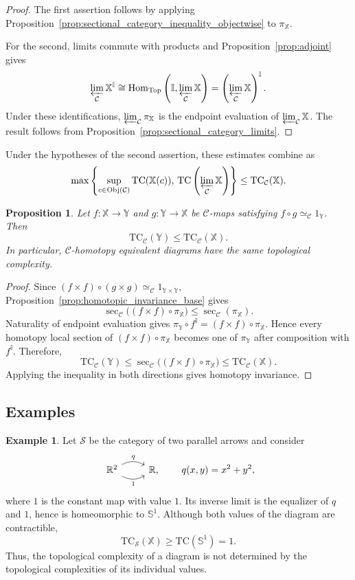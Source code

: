 \documentclass[12pt]{amsart}
\newtheorem{prop}[teo]{Proposition}
\theoremstyle{definition}
\newtheorem{ex}[teo]{Example}
\theoremstyle{remark}
\numberwithin{figure}{section}%
\newcommand{\CC}{\mathcal{C}}
\newcommand{\TC}{\mathrm{TC}}
\newcommand{\Top}{\mathrm{Top}}
\newcommand{\X}{\mathbb{X}}
\newcommand{\Y}{\mathbb{Y}}
\newcommand{\Hom}{\mathrm{Hom}}
\newcommand{\Obj}{\mathrm{Obj}}
\begin{document}
\begin{proof}
The first assertion follows by applying
Proposition~\ref{prop:sectional_category_inequality_objectwise} to
$\pi_{\X}$.

For the second, limits commute with products and
Proposition~\ref{prop:adjoint} gives
\[
\varprojlim_{\CC}\X^{\mathbb I}
\cong
\Hom_{\Top}
\left(
\mathbb I,\varprojlim_{\CC}\X
\right)
=
\left(\varprojlim_{\CC}\X\right)^{\mathbb I}.
\]
Under these identifications, $\varprojlim_{\CC}\pi_{\X}$ is the endpoint
evaluation of $\varprojlim_{\CC}\X$. The result follows from
Proposition~\ref{prop:sectional_category_limits}.
\end{proof}

Under the hypotheses of the second assertion, these estimates combine as
\[
\max\left\{
\sup_{c\in\Obj(\CC)}\TC(\X(c)),
\,
\TC\left(\varprojlim_{\CC}\X\right)
\right\}
\leq
\TC_{\CC}(\X).
\]

\begin{prop}\label{prop:TC-domination}
Let $f\colon\X\to\Y$ and $g\colon\Y\to\X$ be $\CC$-maps satisfying
$f\circ g\simeq_{\CC}1_{\Y}$. Then
\[
\TC_{\CC}(\Y)\leq\TC_{\CC}(\X).
\]
In particular, $\CC$-homotopy equivalent diagrams have the same
topological complexity.
\end{prop}

\begin{proof}
Since $(f\times f)\circ(g\times g)\simeq_{\CC}1_{\Y\times\Y}$,
Proposition~\ref{prop:homotopic_invariance_base} gives
\[
\sec_{\CC}\bigl((f\times f)\circ\pi_{\X}\bigr)
\leq
\sec_{\CC}(\pi_{\X}).
\]
Naturality of endpoint evaluation gives
$\pi_{\Y}\circ f^{\mathbb I}=(f\times f)\circ\pi_{\X}$. Hence every
homotopy local section of $(f\times f)\circ\pi_{\X}$ becomes one of
$\pi_{\Y}$ after composition with $f^{\mathbb I}$. Therefore,
\[
\TC_{\CC}(\Y)
\leq
\sec_{\CC}\bigl((f\times f)\circ\pi_{\X}\bigr)
\leq
\TC_{\CC}(\X).
\]
Applying the inequality in both directions gives homotopy invariance.
\end{proof}

\subsection{Examples}

\begin{ex}\label{ex:contractible-values-nontrivial-TC}
Let $\mathcal S$ be the category of two parallel arrows and consider
\[
\begin{tikzcd}
\mathbb R^2
  \arrow[r,"q",bend left]
  \arrow[r,"1"',bend right]
&
\mathbb R,
\end{tikzcd}
\qquad
q(x,y)=x^2+y^2,
\]
where $1$ is the constant map with value $1$. Its inverse limit is the
equalizer of $q$ and $1$, hence is homeomorphic to $\mathbb S^1$.
Although both values of the diagram are contractible,
\[
\TC_{\mathcal S}(\X)
\geq
\TC(\mathbb S^1)=1.
\]
Thus, the topological complexity of a diagram is not determined by the
topological complexities of its individual values.
\end{ex}
\end{document}
